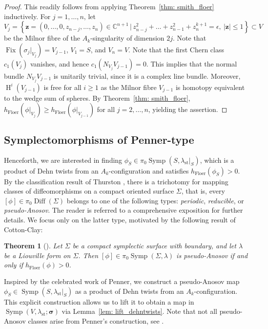 \documentclass[12pt]{article}
\renewcommand{\le}{\leqslant}
\renewcommand{\ge}{\geqslant}
\theoremstyle{theorem}
\newtheorem{theorem}{Theorem}[section]
\theoremstyle{definition}
\theoremstyle{remark}
\numberwithin{equation}{section}
\newcommand{\C}{{\mathbb{C}}}
\DeclareMathOperator{\floer}{Floer}
\DeclareMathOperator{\Diff}{Diff}
\DeclareMathOperator{\Symp}{Symp}
\DeclareMathOperator{\Fix}{Fix}
\DeclareMathOperator{\Ho}{H}
\DeclareMathOperator{\st}{st}
\begin{document}
\begin{proof}
This readily follows from applying Theorem~\ref{thm: smith_floer} inductively.
For $j=1,\dots,n$, let
$$
V_j=\left\{\boldsymbol{z}=(0,\dots,0,z_{n-j},\dots,z_n)\in \C^{n+1} \,\Big|\,   z_{n-j}^2+\dots+z_{n-1}^2+z_n^{k+1}=\epsilon,\ |\boldsymbol{z}|\le 1 \right\}\subset V
$$
be the Milnor fibre of the $A_k$-singularity of dimension $2j$.
Note that $\Fix(\sigma_j|_{V_j})=V_{j-1}$, $V_1=S$, and $V_n=V$.
Note that the first Chern class $c_1(V_j)$ vanishes, and hence $c_1(N_{V_j}V_{j-1})=0$.
This implies that the normal bundle $N_{V_j}V_{j-1}$ is unitarily trivial, since it is a complex line bundle.
Moreover, $\Ho^i(V_{j-1})$ is free for all $i\ge 1$ as the Milnor fibre $V_{j-1}$ is homotopy equivalent to the wedge sum of spheres.
By Theorem~\ref{thm: smith_floer}, $h_{\floer}(\phi|_{V_j})\ge h_{\floer}(\phi|_{V_{j-1}})$ for all $j=2,\dots,n$, yielding the assertion.
\end{proof}

\subsection{Symplectomorphisms of Penner-type }\label{sec: penner_milnor}
Henceforth, we are interested in finding $\phi_S\in \pi_0\Symp(S,\lambda_{\st}|_S)$, which is a product of Dehn twists from an $A_k$-configuration and satisfies $h_{\floer}(\phi_S)>0$.
By the classification result of Thurston \cite{Th88}, there is a trichotomy for mapping classes of diffeomorphisms on a compact oriented surface $\Sigma$, that is, every $[\phi]\in\pi_0\Diff(\Sigma)$ belongs to one of the following types: \emph{periodic}, \emph{reducible}, or \emph{pseudo-Anosov}.
The reader is referred to a comprehensive exposition \cite{FaMa12} for further details.
We focus only on the latter type, motivated by the following result of Cotton-Clay:
\begin{theorem}[{\cite[Corollary~1.7]{Co09}}]\label{thm: cotton_clay}
Let $\Sigma$ be a compact symplectic surface with boundary, and let $\lambda$ be a Liouville form on $\Sigma$.
Then $[\phi]\in\pi_0\Symp(\Sigma,\lambda)$ is pseudo-Anosov if and only if $h_{\floer}(\phi)>0$.
\end{theorem}
Inspired by the celebrated work of Penner, we construct a pseudo-Anosov map $\phi_S\in \Symp(S,\lambda_{\st}|_S)$ as a product  of Dehn twists from an $A_k$-configuration.
This explicit construction allows us to lift it to obtain a map in $\Symp(V,\lambda_{\st};{\bm \sigma})$ via Lemma~\ref{lem: lift_dehntwists}.
Note that not all pseudo-Anosov classes arise from Penner's construction, see \cite[Section~1]{ShSt15}.
\end{document}
